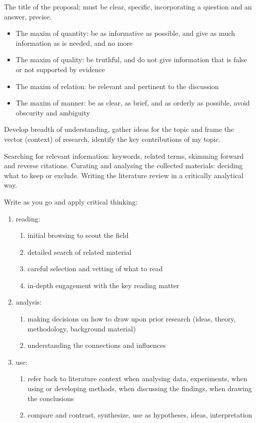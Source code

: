 \documentclass[10pt,a4paper,twocolumn]{article}
\begin{document}
The title of the proposal; must be clear, specific, incorporating a question and an
answer, precise.
\begin{itemize}
  \item The maxim of quantity: be as informative as possible, and give as much information
  as is needed, and no more
  \item The maxim of quality: be truthful, and do not give information that is false or
  not supported by evidence
  \item The maxim of relation: be relevant and pertinent to the discussion
  \item The maxim of manner: be as clear, as brief, and as orderly as possible, avoid
  obscurity and ambiguity
\end{itemize}

Develop breadth of understanding, gather ideas for the topic and frame the vector (context)
of research, identify the key contributions of my topic.

Searching for relevant information: keywords, related terms, skimming forward and reverse
citations. Curating and analysing the collected materials: deciding what to keep or exclude.
Writing the literature review in a critically analytical way.

Write as you go and apply critical thinking:
\begin{enumerate}
  \item reading:
  \begin{enumerate}
    \item initial browsing to scout the field
    \item detailed search of related material
    \item careful selection and vetting of what to read
    \item in-depth engagement with the key reading matter
  \end{enumerate}
  \item analysis:
  \begin{enumerate}
    \item making decisions on how to draw upon prior research (ideas, theory, methodology,
    background material)
    \item understanding the connections and influences
  \end{enumerate}
  \item use:
  \begin{enumerate}
    \item refer back to literature context when analysing data, experiments, when using
    or developing methods, when discussing the findings, when drawing the conclusions
    \item compare and contrast, synthesize, use as hypotheses, ideas, interpretation
  \end{enumerate}
\end{enumerate}
\end{document}
